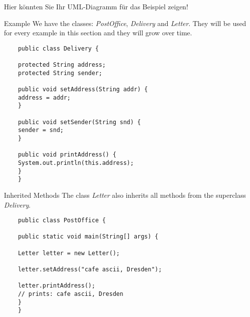 \begin{frame}
	\huge Hier könnten Sie Ihr UML-Diagramm für das Beispiel zeigen!
\end{frame}

\begin{frame}[fragile]{Example}
	We have the classes: \emph{PostOffice}, \emph{Delivery} and \emph{Letter}.
	They will be used for every example in this section and they will grow over time.
	\begin{lstlisting}
	public class Delivery {
	
	protected String address;
	protected String sender;
	
	public void setAddress(String addr) {
	address = addr;
	}
	
	public void setSender(String snd) {
	sender = snd;
	}
	
	public void printAddress() {
	System.out.println(this.address);
	}
	}
	\end{lstlisting}
\end{frame}

\begin{frame}[fragile]{Inherited Methods}
	The class \emph{Letter} also inherits all methods from the superclass \emph{Delivery}.
	\begin{lstlisting}
	public class PostOffice {
	
	public static void main(String[] args) {
	
	Letter letter = new Letter();
	
	letter.setAddress("cafe ascii, Dresden");
	
	letter.printAddress();
	// prints: cafe ascii, Dresden
	}	
	}
	\end{lstlisting}
\end{frame}

